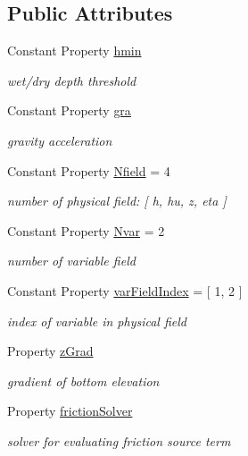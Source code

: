 \subsection*{Public Attributes}
\begin{DoxyCompactItemize}
\item 
Constant Property \hyperlink{class_s_w_e_abstract1d_aefcd41b64a6d475b6ba4c99508853a3a}{hmin}
\begin{DoxyCompactList}\small\item\em wet/dry depth threshold \end{DoxyCompactList}\item 
Constant Property \hyperlink{class_s_w_e_abstract1d_ae7a30e37952871379dac6774112b1828}{gra}
\begin{DoxyCompactList}\small\item\em gravity acceleration \end{DoxyCompactList}\item 
Constant Property \hyperlink{class_s_w_e_abstract1d_a9ac0c52abacd5eb41c2821e42237cb67}{Nfield} = 4
\begin{DoxyCompactList}\small\item\em number of physical field\+: \mbox{[} h, hu, z, eta \mbox{]} \end{DoxyCompactList}\item 
Constant Property \hyperlink{class_s_w_e_abstract1d_ace93a7188e7ce1fba217097fd870a04a}{Nvar} = 2
\begin{DoxyCompactList}\small\item\em number of variable field \end{DoxyCompactList}\item 
Constant Property \hyperlink{class_s_w_e_abstract1d_acc388ba4a119a6652be1457d66216597}{var\+Field\+Index} = \mbox{[} 1, 2 \mbox{]}
\begin{DoxyCompactList}\small\item\em index of variable in physical field \end{DoxyCompactList}\item 
Property \hyperlink{class_s_w_e_abstract1d_a97b5ea254872da78a8762002b657a984}{z\+Grad}
\begin{DoxyCompactList}\small\item\em gradient of bottom elevation \end{DoxyCompactList}\item 
Property \hyperlink{class_s_w_e_abstract1d_a45882d6eb9eeba9ac39247bb3e3823df}{friction\+Solver}
\begin{DoxyCompactList}\small\item\em solver for evaluating friction source term \end{DoxyCompactList}\item 

\end{DoxyCompactItemize}
